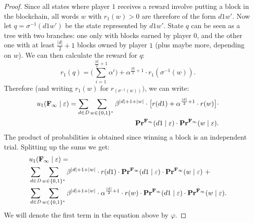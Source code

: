 \begin{proof}
Since all states where player $1$ receives a reward involve putting a block in the blockchain, all words 
$w$ with $r_1(w) > 0$ are therefore of the form $d 1 w'$. Now let $q = \sigma^{-1}(d1w')$ be the state represented by $d1w'$. 
State $q$ can be seen as a tree with two branches: one only with blocks earned by player $0$, and the other one 
with at least ${\frac{|d|}{2}+1}$ blocks owned by player $1$ (plus maybe more, depending on $w$). 
We can then calculate the reward for $q$: 
$$r_1(q) = \big(\sum_{i=1}^{\frac{|d|}{2}+1}\alpha^i \big)+ \alpha^{\frac{|d|}{2}+1}\cdot r_1(\sigma^{-1}(w)).$$
Therefore (and writing $r_1(w)$ for $r_(\sigma^{-1}(w)))$, we can write:
%
%
\begin{eqnarray*}
u_1({\rm {\bf F_\infty}}\mid\varepsilon) = \sum_{d\in {\rm {\it D}}}  \sum_{w\in \{0,1\}^*}\beta^{|d|+1+|w|}\cdot \big[r(d1) + \alpha^{\frac{|d|}{2}+1}\cdot r(w)\big] \cdot \\ \mathbf{Pr}^{{\rm {\bf F_\infty}}}(d1\mid \varepsilon)\cdot \mathbf{Pr}^{{\rm {\bf F_\infty}}}(w\mid \varepsilon).
\end{eqnarray*}
%
The product of probabilities is obtained since winning a block is an independent trial. Splitting up the sums we get:
\begin{align*}
 & u_1({\rm {\bf F_\infty}}\mid\varepsilon) = \\
 & \sum_{d\in {\rm {\it D}}}  \sum_{w\in \{0,1\}^*}\beta^{|d|+1+|w|}\cdot r(d1) \cdot \mathbf{Pr}^{{\rm {\bf F_\infty}}}(d1\mid \varepsilon)\cdot \mathbf{Pr}^{{\rm {\bf F_\infty}}}(w\mid \varepsilon)
 \mbox{ } +\\
 & \sum_{d\in {\rm {\it D}}}  \sum_{w\in \{0,1\}^*}\beta^{|d|+1+|w|}\cdot  \alpha^{\frac{|d|}{2}+1}\cdot r(w) \cdot \mathbf{Pr}^{{\rm {\bf F_\infty}}}(d1\mid \varepsilon)\cdot \mathbf{Pr}^{{\rm {\bf F_\infty}}}(w\mid \varepsilon).
\end{align*}
%
We will denote the first term in the equation above by $\varphi$. 
%


\end{proof}
